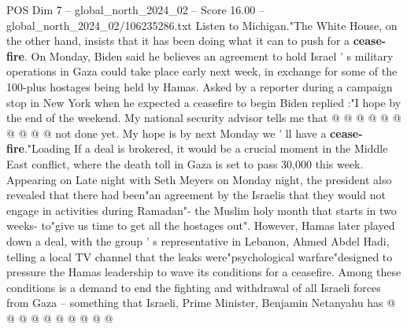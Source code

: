 \begin{textsample}{POS Dim 7 – global\_north\_2024\_02 – Score 16.00 – global\_north\_2024\_02/106235286.txt}
Listen to Michigan."The White House, on the other hand, insists that it has been doing what it can to push for a \textbf{cease-fire}.
On Monday, Biden said he believes an agreement to hold Israel ' s military operations in Gaza could take place early next week, in exchange for some of the 100-plus hostages being held by Hamas.
Asked by a reporter during a campaign stop in New York when he expected a ceasefire to begin Biden replied :"I hope by the end of the weekend.
My national security advisor tells me that @ @ @ @ @ @ @ @ @ @ not done yet.
My hope is by next Monday we ' ll have a \textbf{cease-fire}."Loading If a deal is brokered, it would be a crucial moment in the Middle East conflict, where the death toll in Gaza is set to pass 30,000 this week.
Appearing on Late night with Seth Meyers on Monday night, the president also revealed that there had been"an agreement by the Israelis that they would not engage in activities during Ramadan"- the Muslim holy month that starts in two weeks- to"give us time to get all the hostages out".
However, Hamas later played down a deal, with the group ' s representative in Lebanon, Ahmed Abdel Hadi, telling a local TV channel that the leaks were"psychological warfare"designed to pressure the Hamas leadership to wave its conditions for a ceasefire.
Among these conditions is a demand to end the fighting and withdrawal of all Israeli forces from Gaza -- something that Israeli, Prime Minister, Benjamin Netanyahu has @ @ @ @ @ @ @ @ @ @

\end{textsample}
